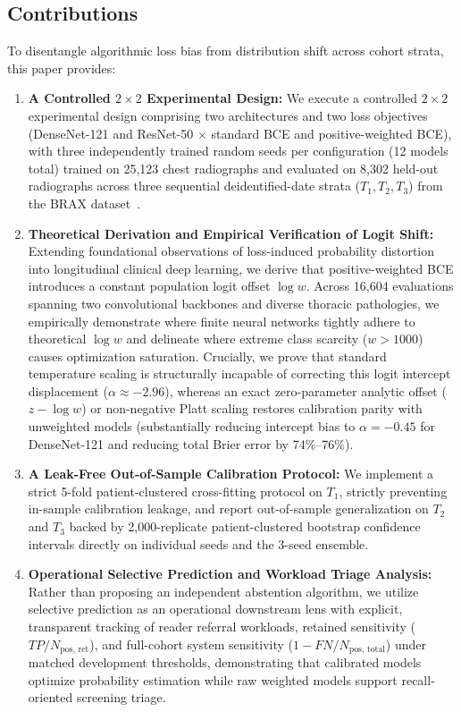 \documentclass[preprint,12pt]{elsarticle}
\begin{document}
\subsection{Contributions}
To disentangle algorithmic loss bias from distribution shift across cohort strata, this paper provides:
\begin{enumerate}
    \item \textbf{A Controlled $2 \times 2$ Experimental Design:} We execute a controlled $2 \times 2$ experimental design comprising two architectures and two loss objectives (DenseNet-121 and ResNet-50 $\times$ standard BCE and positive-weighted BCE), with three independently trained random seeds per configuration (12 models total) trained on 25,123 chest radiographs and evaluated on 8,302 held-out radiographs across three sequential deidentified-date strata ($T_1, T_2, T_3$) from the BRAX dataset~\cite{reis2022brax}.
    \item \textbf{Theoretical Derivation and Empirical Verification of Logit Shift:} Extending foundational observations of loss-induced probability distortion~\cite{king2001logistic, caplin2022calibrating} into longitudinal clinical deep learning, we derive that positive-weighted BCE introduces a constant population logit offset $\log w$. Across 16,604 evaluations spanning two convolutional backbones and diverse thoracic pathologies, we empirically demonstrate where finite neural networks tightly adhere to theoretical $\log w$ and delineate where extreme class scarcity ($w > 1000$) causes optimization saturation. Crucially, we prove that standard temperature scaling is structurally incapable of correcting this logit intercept displacement ($\alpha \approx -2.96$), whereas an exact zero-parameter analytic offset ($z - \log w$) or non-negative Platt scaling restores calibration parity with unweighted models (substantially reducing intercept bias to $\alpha = -0.45$ for DenseNet-121 and reducing total Brier error by 74\%--76\%).
    \item \textbf{A Leak-Free Out-of-Sample Calibration Protocol:} We implement a strict 5-fold patient-clustered cross-fitting protocol on $T_1$, strictly preventing in-sample calibration leakage, and report out-of-sample generalization on $T_2$ and $T_3$ backed by 2,000-replicate patient-clustered bootstrap confidence intervals directly on individual seeds and the 3-seed ensemble.
    \item \textbf{Operational Selective Prediction and Workload Triage Analysis:} Rather than proposing an independent abstention algorithm, we utilize selective prediction as an operational downstream lens with explicit, transparent tracking of reader referral workloads, retained sensitivity ($TP / N_{\text{pos, ret}}$), and full-cohort system sensitivity ($1 - FN / N_{\text{pos, total}}$) under matched development thresholds, demonstrating that calibrated models optimize probability estimation while raw weighted models support recall-oriented screening triage.
\end{enumerate}
\end{document}
